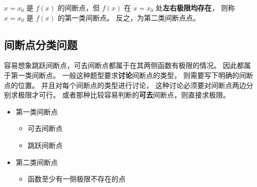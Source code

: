 \begin{definition}[第一/二类间断点]
    \label{def:discontinunities-chinese-version}
    $x = x_0$ 是 $f(x)$ 的间断点，但 $f(x)$ 在 $x = x_0$ 处\textbf{左右极限均存在}，
    则称 $x = x_0$ 是 $f(x)$ 的第一类间断点。
    反之，为第二类间断点点。
\end{definition}

\subsection{间断点分类问题}
\label{function-discontinunities-classfication-questions}

容易想象跳跃间断点，可去间断点都属于在其两侧函数有极限的情况。
因此都属于第一类间断点。
一般这种题型要求\textbf{讨论}间断点的类型，
则需要写下明确的间断点的位置。 并且对每个间断点的类型进行讨论，
这种讨论必须要对间断点两边分别求极限才可行。
或者那种比较容易判断的\textbf{可去}间断点，则直接求极限。

\begin{itemize}
    \item 第一类间断点
        \begin{itemize} 
            \item 可去间断点
            \item 跳跃间断点
        \end{itemize}
    \item 第二类间断点
        \begin{itemize}
            \item 函数至少有一侧极限不存在的点
        \end{itemize}
\end{itemize}

